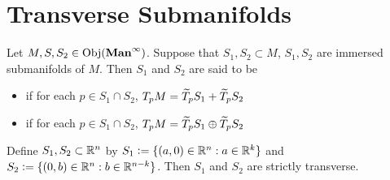 \documentclass{book}
\begin{document}
	\newpage

	\section{Transverse Submanifolds}

	\begin{defn} 
		Let $M, S, S_2 \in \operatorname{Obj}(\operatorname*{\text{\textbf{Man}}^{\infty}})$. Suppose that $S_1, S_2 \subset M$, $S_1, S_2$ are immersed submanifolds of $M$. Then $S_1$ and $S_2$ are said to be 
		\begin{itemize}
			\item {} if for each $p \in S_1 \cap S_2$, $T_pM = \widetilde{T}_p S_1 + \widetilde{T}_p S_2$
			\item {} if for each $p \in S_1 \cap S_2$, $T_pM = \widetilde{T}_p S_1 \oplus \widetilde{T}_p S_2$ 
		\end{itemize} 
	\end{defn}

	\begin{ex} 
		Define $S_1, S_2 \subset \mathbb{R}^n$ by $S_1 \vcentcolon= \{(a,0) \in \mathbb{R}^n: a \in \mathbb{R}^k\}$ and $S_2 \vcentcolon= \{(0,b) \in \mathbb{R}^n: b \in \mathbb{R}^{n-k}\}$. Then $S_1$ and $S_2$ are strictly transverse.
	\end{ex}
	
\end{document}
